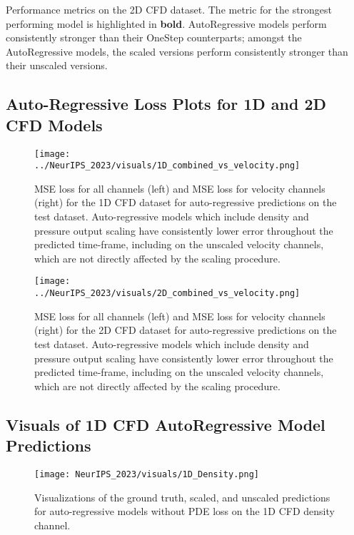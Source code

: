 \begin{table}[h]
    \caption{Performance metrics on the 2D CFD dataset. The metric for the strongest performing model is highlighted in \textbf{bold}. AutoRegressive models perform consistently stronger than their OneStep counterparts; amongst the AutoRegressive models, the scaled versions perform consistently stronger than their unscaled versions.}
    \label{tab:2D_metrics}

\end{table}

\newpage
\subsection{Auto-Regressive Loss Plots for 1D and 2D CFD Models}

\begin{figure}[h]
    \centering
    \texttt{[image: ../NeurIPS\_2023/visuals/1D\_combined\_vs\_velocity.png]}
    \caption{MSE loss for all channels (left) and MSE loss for velocity channels (right) for the 1D CFD dataset for auto-regressive predictions on the test dataset. Auto-regressive models which include density and pressure output scaling have consistently lower error throughout the predicted time-frame, including on the unscaled velocity channels, which are not directly affected by the scaling procedure.}
    \label{fig:combo_vs_vel1}
\end{figure}

\begin{figure}[h]
    \centering
    \texttt{[image: ../NeurIPS\_2023/visuals/2D\_combined\_vs\_velocity.png]}
    \caption{MSE loss for all channels (left) and MSE loss for velocity channels (right) for the 2D CFD dataset for auto-regressive predictions on the test dataset. Auto-regressive models which include density and pressure output scaling have consistently lower error throughout the predicted time-frame, including on the unscaled velocity channels, which are not directly affected by the scaling procedure.}
    \label{fig:combo_vs_vel2}
\end{figure}

\newpage
\subsection{Visuals of 1D CFD AutoRegressive Model Predictions}

\begin{figure}[h!]
    \centering
    \texttt{[image: NeurIPS\_2023/visuals/1D\_Density.png]}
    \caption{Visualizations of the ground truth, scaled, and unscaled predictions for auto-regressive models without PDE loss on the 1D CFD density channel.}
    \label{fig:1d_rho}
\end{figure}

